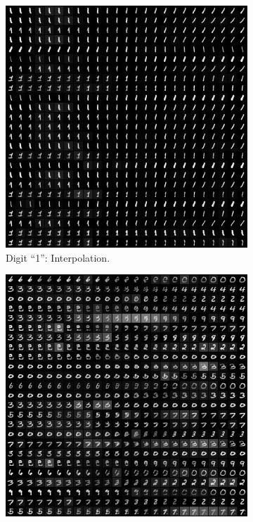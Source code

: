     \begin{figure}[htbp]
        \centering
        \begin{subfigure}[b]{0.45\textwidth}
            \includegraphics[width=\textwidth]{Chapter5/results/mnist/digit_1_interpolation.png}
            \caption{\scriptsize Digit ``1'': Interpolation.}
        \end{subfigure}
        \begin{subfigure}[b]{0.45\textwidth}
            \includegraphics[width=\textwidth]{Chapter5/results/mnist/all_digits_interpolation.png}

\end{subfigure}
\end{figure}
